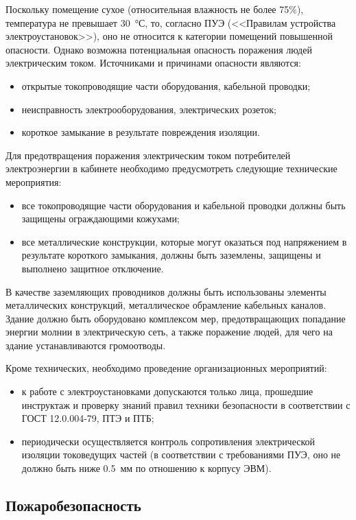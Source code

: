 Поскольку помещение сухое (относительная влажность не более 75\%), температура не превышает 30~°С, то, согласно ПУЭ (<<Правилам устройства электроустановок>>), оно не относится к категории помещений повышенной опасности.
Однако возможна потенциальная опасность поражения людей электрическим током.
Источниками и причинами опасности являются:
\begin{itemize}
  \item открытые токопроводящие части оборудования, кабельной проводки;
  \item неисправность электрооборудования, электрических розеток;
  \item короткое замыкание в результате повреждения изоляции.
\end{itemize}

Для предотвращения поражения электрическим током потребителей электроэнергии в кабинете необходимо предусмотреть следующие технические мероприятия:
\begin{itemize}
  \item все токопроводящие части оборудования и кабельной проводки должны быть защищены ограждающими кожухами;
  \item все металлические конструкции, которые могут оказаться под напряжением в результате короткого замыкания, должны быть заземлены, защищены и выполнено защитное   отключение.
\end{itemize}

В качестве заземляющих проводников должны быть использованы элементы металлических конструкций, металлическое обрамление кабельных каналов.
Здание должно быть оборудовано комплексом мер, предотвращающих попадание энергии молнии в электрическую сеть, а также поражение людей, для чего на здание устанавливаются громоотводы.

Кроме технических, необходимо проведение организационных мероприятий:
\begin{itemize}
  \item к работе с электроустановками допускаются только лица, прошедшие инструктаж и проверку знаний правил техники безопасности в соответствии с ГОСТ 12.0.004-79, ПТЭ и ПТБ;
  \item периодически осуществляется контроль сопротивления электрической изоляции токоведущих частей (в соответствии с требованиями ПУЭ, оно не должно быть ниже 0.5~мм по отношению к корпусу ЭВМ).
\end{itemize}

\subsection{Пожаробезопасность}

